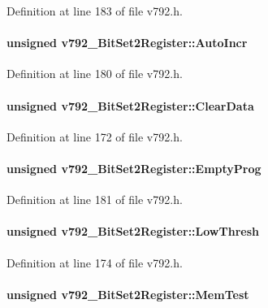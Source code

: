 Definition at line 183 of file v792.h.
\paragraph[{AutoIncr}]{\setlength{\rightskip}{0pt plus 5cm}unsigned {\bf v792\_\-BitSet2Register::AutoIncr}}\hfill\label{unionv792__BitSet2Register_acaaa01438a5076ae5290b47e9f9ad808}


Definition at line 180 of file v792.h.
\paragraph[{ClearData}]{\setlength{\rightskip}{0pt plus 5cm}unsigned {\bf v792\_\-BitSet2Register::ClearData}}\hfill\label{unionv792__BitSet2Register_ae0db188fc9bacbb1075364db5e3575e0}


Definition at line 172 of file v792.h.
\paragraph[{EmptyProg}]{\setlength{\rightskip}{0pt plus 5cm}unsigned {\bf v792\_\-BitSet2Register::EmptyProg}}\hfill\label{unionv792__BitSet2Register_a8e0c0e5e4fddf5fbf509f4336d0cfdec}


Definition at line 181 of file v792.h.
\paragraph[{LowThresh}]{\setlength{\rightskip}{0pt plus 5cm}unsigned {\bf v792\_\-BitSet2Register::LowThresh}}\hfill\label{unionv792__BitSet2Register_a93dc02ff716697cc3a77c781dc30229f}


Definition at line 174 of file v792.h.
\paragraph[{MemTest}]{\setlength{\rightskip}{0pt plus 5cm}unsigned {\bf v792\_\-BitSet2Register::MemTest}}\hfill\label{unionv792__BitSet2Register_af869aed5e7244dd19aa0b57801f8fffd}



